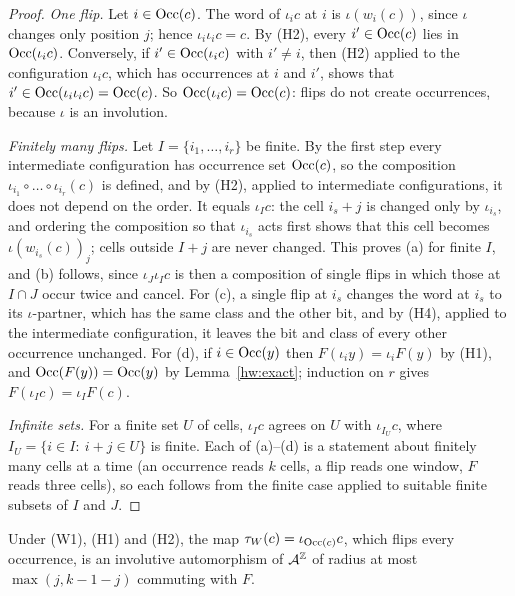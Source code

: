 \begin{proof}
\emph{One flip.} Let $i\in\operatorname{Occ}(c)$. The word of $\iota_ic$ at $i$ is $\iota(w_i(c))$, since $\iota$ changes only position $j$; hence $\iota_i\iota_ic=c$. By (H2), every $i'\in\operatorname{Occ}(c)$ lies in $\operatorname{Occ}(\iota_ic)$. Conversely, if $i'\in\operatorname{Occ}(\iota_ic)$ with $i'\ne i$, then (H2) applied to the configuration $\iota_ic$, which has occurrences at $i$ and $i'$, shows that $i'\in\operatorname{Occ}(\iota_i\iota_ic)=\operatorname{Occ}(c)$. So $\operatorname{Occ}(\iota_ic)=\operatorname{Occ}(c)$: flips do not create occurrences, because $\iota$ is an involution.

\emph{Finitely many flips.} Let $I=\{i_1,\dots,i_r\}$ be finite. By the first step every intermediate configuration has occurrence set $\operatorname{Occ}(c)$, so the composition $\iota_{i_1}\circ\dots\circ\iota_{i_r}(c)$ is defined, and by (H2), applied to intermediate configurations, it does not depend on the order. It equals $\iota_Ic$: the cell $i_s+j$ is changed only by $\iota_{i_s}$, and ordering the composition so that $\iota_{i_s}$ acts first shows that this cell becomes $\iota(w_{i_s}(c))_j$; cells outside $I+j$ are never changed. This proves (a) for finite $I$, and (b) follows, since $\iota_J\iota_Ic$ is then a composition of single flips in which those at $I\cap J$ occur twice and cancel. For (c), a single flip at $i_s$ changes the word at $i_s$ to its $\iota$-partner, which has the same class and the other bit, and by (H4), applied to the intermediate configuration, it leaves the bit and class of every other occurrence unchanged. For (d), if $i\in\operatorname{Occ}(y)$ then $F(\iota_iy)=\iota_iF(y)$ by (H1), and $\operatorname{Occ}(F(y))=\operatorname{Occ}(y)$ by Lemma~\ref{hw:exact}; induction on $r$ gives $F(\iota_Ic)=\iota_IF(c)$.

\emph{Infinite sets.} For a finite set $U$ of cells, $\iota_Ic$ agrees on $U$ with $\iota_{I_U}c$, where $I_U=\{i\in I:\ i+j\in U\}$ is finite. Each of (a)--(d) is a statement about finitely many cells at a time (an occurrence reads $k$ cells, a flip reads one window, $F$ reads three cells), so each follows from the finite case applied to suitable finite subsets of $I$ and $J$.
\end{proof}

\begin{corollary}\label{hw:flipall}
Under \textup{(W1)}, \textup{(H1)} and \textup{(H2)}, the map $\tau_W(c)=\iota_{\operatorname{Occ}(c)}c$, which flips every occurrence, is an involutive automorphism of $\mathcal{A}^{\mathbb{Z}}$ of radius at most $\max(j,k-1-j)$ commuting with $F$.
\end{corollary}

